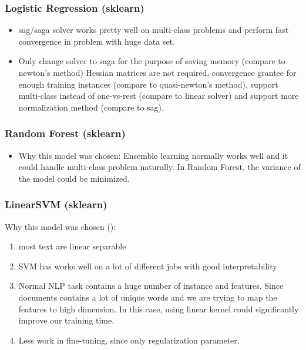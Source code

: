 \documentclass[11pt]{article}
\begin{document}
\subsubsection{Logistic Regression (sklearn)}
\begin{itemize}
      \item 
            sag/saga solver works pretty well on 
            multi-class problems and perform fast convergence in problem with huge data set.

      \item Only change solver to saga for the purpose of saving memory
            (compare to newton's method) Hessian matrices are not required, 
            convergence grantee for enough training instances (compare to 
            quasi-newton's method),
            support multi-class instead of one-vs-rest (compare to linear solver) 
            and support more normalization method (compare to sag).
\end{itemize}

\subsubsection{Random Forest (sklearn)}
\begin{itemize}
      \item Why this model was chosen: Ensemble learning normally works well and 
            it could handle multi-class problem naturally. In Random Forest, the
            variance of the model could be minimized.
\end{itemize}

\subsubsection{LinearSVM (sklearn)}
Why this model was chosen ():
\begin{enumerate}
      \item most text are linear separable
      \item SVM has works well on a lot of different jobs with good interpretability
      \item Normal NLP task contains a huge number of instance and features.
            Since documents contains a lot of unique words and we are trying to
            map the features to high dimension. In this case, using linear
            kernel could significantly improve our training time.
      \item Less work in fine-tuning, since only regularization parameter.
\end{enumerate}
\end{document}
